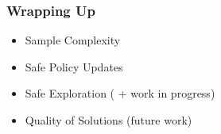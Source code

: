 \documentclass[aspectratio=169]{beamer}
\begin{document}
\begin{frame}
\frametitle{Wrapping Up}
\begin{overlayarea}{\textwidth}{\textheight}
\begin{itemize}
	\setlength{\itemsep}{10pt}
	\item Sample Complexity~\citep{papini2018stochastic,xu2019improved,xu2019sample}
	\item Safe Policy Updates~\citep{papini2019smoothing}
	\item Safe Exploration (\cite{papini2019optimistic} + work in progress)
	\item Quality of Solutions (future work)
\end{itemize}
\vspace{1cm}
\end{overlayarea}
\end{frame}
\end{document}
